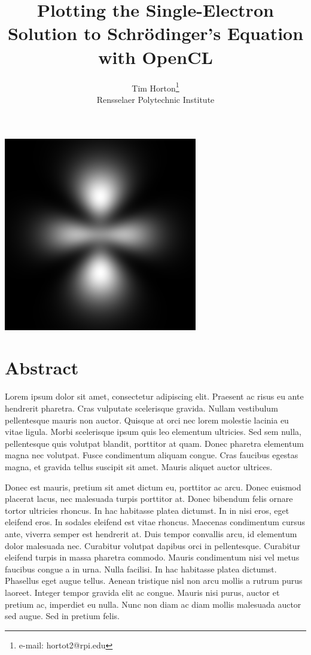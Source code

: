 \documentclass{acmsiggraph}
\title{Plotting the Single-Electron Solution to Schr\"{o}dinger's Equation with OpenCL}
\author{Tim Horton\thanks{e-mail: hortot2@rpi.edu}\\Rensselaer Polytechnic Institute}
\begin{document}
\maketitle

\includegraphics[width=84.5mm]{320.png}

\section{Abstract}

Lorem ipsum dolor sit amet, consectetur adipiscing elit. Praesent ac risus eu ante hendrerit pharetra. Cras vulputate scelerisque gravida. Nullam vestibulum pellentesque mauris non auctor. Quisque at orci nec lorem molestie lacinia eu vitae ligula. Morbi scelerisque ipsum quis leo elementum ultricies. Sed sem nulla, pellentesque quis volutpat blandit, porttitor at quam. Donec pharetra elementum magna nec volutpat. Fusce condimentum aliquam congue. Cras faucibus egestas magna, et gravida tellus suscipit sit amet. Mauris aliquet auctor ultrices.

Donec est mauris, pretium sit amet dictum eu, porttitor ac arcu. Donec euismod placerat lacus, nec malesuada turpis porttitor at. Donec bibendum felis ornare tortor ultricies rhoncus. In hac habitasse platea dictumst. In in nisi eros, eget eleifend eros. In sodales eleifend est vitae rhoncus. Maecenas condimentum cursus ante, viverra semper est hendrerit at. Duis tempor convallis arcu, id elementum dolor malesuada nec. Curabitur volutpat dapibus orci in pellentesque. Curabitur eleifend turpis in massa pharetra commodo. Mauris condimentum nisi vel metus faucibus congue a in urna. Nulla facilisi. In hac habitasse platea dictumst. Phasellus eget augue tellus. Aenean tristique nisl non arcu mollis a rutrum purus laoreet. Integer tempor gravida elit ac congue. Mauris nisi purus, auctor et pretium ac, imperdiet eu nulla. Nunc non diam ac diam mollis malesuada auctor sed augue. Sed in pretium felis.
\end{document}
